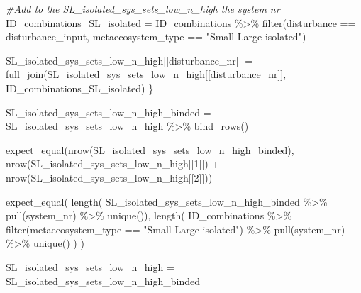 \documentclass[
]{article}
\newenvironment{Shaded}{\begin{snugshade}}{\end{snugshade}}
\newcommand{\CommentTok}[1]{\textcolor[rgb]{0.56,0.35,0.01}{\textit{#1}}}
\newcommand{\DecValTok}[1]{\textcolor[rgb]{0.00,0.00,0.81}{#1}}
\newcommand{\FunctionTok}[1]{\textcolor[rgb]{0.00,0.00,0.00}{#1}}
\newcommand{\NormalTok}[1]{#1}
\newcommand{\OtherTok}[1]{\textcolor[rgb]{0.56,0.35,0.01}{#1}}
\newcommand{\SpecialCharTok}[1]{\textcolor[rgb]{0.00,0.00,0.00}{#1}}
\newcommand{\StringTok}[1]{\textcolor[rgb]{0.31,0.60,0.02}{#1}}
\begin{document}
\begin{Shaded}
\begin{Highlighting}[]
  \CommentTok{\#Add to the SL\_isolated\_sys\_sets\_low\_n\_high the system nr  }
\NormalTok{  ID\_combinations\_SL\_isolated }\OtherTok{=}\NormalTok{ ID\_combinations }\SpecialCharTok{\%\textgreater{}\%}
    \FunctionTok{filter}\NormalTok{(disturbance }\SpecialCharTok{==}\NormalTok{ disturbance\_input,}
\NormalTok{           metaecosystem\_type }\SpecialCharTok{==} \StringTok{"Small{-}Large isolated"}\NormalTok{)}
  
\NormalTok{  SL\_isolated\_sys\_sets\_low\_n\_high[[disturbance\_nr]] }\OtherTok{=} \FunctionTok{full\_join}\NormalTok{(SL\_isolated\_sys\_sets\_low\_n\_high[[disturbance\_nr]], }
\NormalTok{                                                     ID\_combinations\_SL\_isolated)}
\NormalTok{\}}

\NormalTok{SL\_isolated\_sys\_sets\_low\_n\_high\_binded }\OtherTok{=}\NormalTok{ SL\_isolated\_sys\_sets\_low\_n\_high }\SpecialCharTok{\%\textgreater{}\%}
  \FunctionTok{bind\_rows}\NormalTok{()}

\FunctionTok{expect\_equal}\NormalTok{(}\FunctionTok{nrow}\NormalTok{(SL\_isolated\_sys\_sets\_low\_n\_high\_binded),}
             \FunctionTok{nrow}\NormalTok{(SL\_isolated\_sys\_sets\_low\_n\_high[[}\DecValTok{1}\NormalTok{]]) }\SpecialCharTok{+} \FunctionTok{nrow}\NormalTok{(SL\_isolated\_sys\_sets\_low\_n\_high[[}\DecValTok{2}\NormalTok{]]))}

\FunctionTok{expect\_equal}\NormalTok{(}
  \FunctionTok{length}\NormalTok{(}
\NormalTok{    SL\_isolated\_sys\_sets\_low\_n\_high\_binded }\SpecialCharTok{\%\textgreater{}\%} 
      \FunctionTok{pull}\NormalTok{(system\_nr) }\SpecialCharTok{\%\textgreater{}\%} 
      \FunctionTok{unique}\NormalTok{()),}
  \FunctionTok{length}\NormalTok{(}
\NormalTok{    ID\_combinations }\SpecialCharTok{\%\textgreater{}\%} 
      \FunctionTok{filter}\NormalTok{(metaecosystem\_type }\SpecialCharTok{==} \StringTok{"Small{-}Large isolated"}\NormalTok{) }\SpecialCharTok{\%\textgreater{}\%} 
      \FunctionTok{pull}\NormalTok{(system\_nr) }\SpecialCharTok{\%\textgreater{}\%} 
      \FunctionTok{unique}\NormalTok{()}
\NormalTok{    )}
\NormalTok{  )}

\NormalTok{SL\_isolated\_sys\_sets\_low\_n\_high }\OtherTok{=}\NormalTok{ SL\_isolated\_sys\_sets\_low\_n\_high\_binded}
\end{Highlighting}
\end{Shaded}
\end{document}
